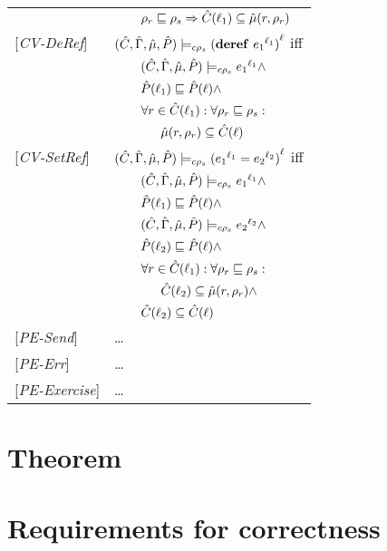 \begin{tabular} {l l l l}
&&\multicolumn{2}{l}{$\rho_r \sqsubseteq \rho_s \Rightarrow \hat{C}(\ell_1) \subseteq \hat{\mu}(r, \rho_r) $}\\
{[\textit{CV-DeRef}]}&\multicolumn{3}{l}{$(\hat{C},\hat{\Gamma},\hat{\mu},\hat{P}) \models_{c \rho_s} {(\mathbf{deref}\ {e_1}^{\ell_1})}^{\ell} $ iff}\\
&&\multicolumn{2}{l}{$ (\hat{C},\hat{\Gamma},\hat{\mu},\hat{P}) \models_{c \rho_s} {e_1}^{\ell_1}\wedge $}\\
&&\multicolumn{2}{l}{$\hat{P}(\ell_1) \sqsubseteq \hat{P}(\ell) \wedge$}\\
&&\multicolumn{2}{l}{$\forall r \in \hat{C}(\ell_1) : \forall \rho_r \sqsubseteq \rho_s :$}\\
&&&$\hat{\mu}(r, \rho_r) \subseteq \hat{C}(\ell)$ \\
{[\textit{CV-SetRef}]}&\multicolumn{3}{l}{$(\hat{C},\hat{\Gamma},\hat{\mu},\hat{P}) \models_{c \rho_s} {({e_1}^{\ell_1} = {e_2}^{\ell_2})}^{\ell} $ iff}\\
&&\multicolumn{2}{l}{$ (\hat{C},\hat{\Gamma},\hat{\mu},\hat{P}) \models_{c \rho_s} {e_1}^{\ell_1} \wedge $}\\
&&\multicolumn{2}{l}{$ \hat{P}(\ell_1) \sqsubseteq \hat{P}(\ell) \wedge $}\\
&&\multicolumn{2}{l}{$ (\hat{C},\hat{\Gamma},\hat{\mu},\hat{P}) \models_{c \rho_s} {e_2}^{\ell_2} \wedge $}\\
&&\multicolumn{2}{l}{$ \hat{P}(\ell_2) \sqsubseteq \hat{P}(\ell) \wedge $}\\
&&\multicolumn{2}{l}{$ \forall r \in \hat{C}(\ell_1) : \forall \rho_r \sqsubseteq \rho_s :$}\\
&&&$\hat{C}(\ell_2) \subseteq \hat{\mu}(r, \rho_r) \wedge$ \\
&&\multicolumn{2}{l}{$\hat{C}(\ell_2) \subseteq \hat{C}(\ell) $} \\
{[\textit{PE-Send}]}& \dots \\
{[\textit{PE-Err}]}& \dots \\
{[\textit{PE-Exercise}]}& \dots \\
\end{tabular}

\section{Theorem} %
\label{sec:Theorem}

\section{Requirements for correctness} %
\label{sec:CorrectnesReqs}